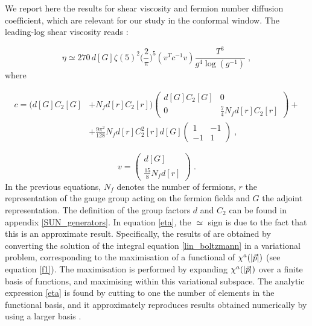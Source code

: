  We report here the results for shear viscosity and fermion number diffusion coefficient, which are relevant for our study in the conformal window. The leading-log shear viscosity reads \cite{Arnold:2000dr}:

 \begin{equation}   
\eta \simeq 270 \, d [G] \zeta(5)^2 \biggl( \frac{2}{\pi} \biggr)^5 (v^T c^{-1} v) \frac{T^3}{g^4 \log( g^{-1})}\;,
\label{eta}
\end{equation}
%
where  

\begin{equation}
\begin{split}
c =  (d [G] C_2 [G]  & + N_f d [r] C_2 [r])
\begin{pmatrix}
d [G] C_2 [G] & 0 \\
0 & \frac{7}{4} N_f d [r] C_2 [r]
\end{pmatrix}
+  \\
& + \frac{9 \pi^2}{128} N_f d [r] C_2^2 [r] d [G]
\begin{pmatrix}
1 & -1 \\
-1 & 1
\end{pmatrix} \;,
\end{split}
\label{c_visc}
\end{equation}

\begin{equation}
v = 
\begin{pmatrix}
d [G] \\
\frac{15}{8} N_f d [r]
\end{pmatrix} \; .
\label{v_visc}
\end{equation}
%
In the previous equations, $N_f$ denotes the number of fermions, $r$ the representation of the gauge group acting on the fermion fields and $G$ the adjoint representation. The definition of the group factors $d$ and $C_2$ can be found in appendix \ref{SUN_generators}. In equation \ref{eta}, the $\simeq$ sign is due to the fact that this is an approximate result. Specifically,  the results of \cite{Arnold:2000dr,Arnold:2003zc} are obtained by converting the solution of the integral equation \ref{lin_boltzmann} in a variational problem, corresponding to the maximisation of a functional of $\chi^a(\abs{\vec p})$ (see equation \ref{f1}). The maximisation is performed by expanding $\chi^a(\abs{\vec p})$ over a finite basis of functions, and maximising within this variational subspace. The analytic expression \ref{eta} is found by cutting to one the number of elements in the functional basis, and it approximately reproduces results obtained numerically by using a larger basis \cite{Arnold:2000dr}.


